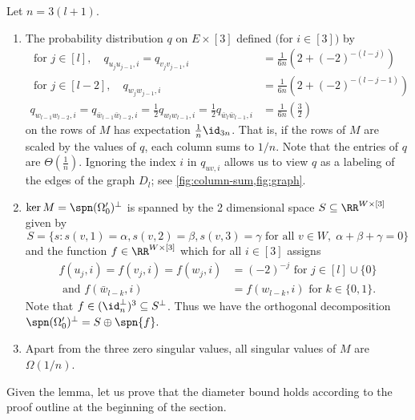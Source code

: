  
 \begin{lem}\label{lem:diameter}Let $n = 3(l + 1)$. 
\begin{enumerate}
\item\label{it:stoch}The probability distribution $q$ on $E\times [3]$ defined $($for $i\in [3])$ by 
\begin{align*}\text{ for }j \in [l], \quad q_{u_j u_{j-1}, i} = q_{v_j v_{j -1}, i} &= \frac{1}{6n} \left(2 + (-2)^{- (l - j)}\right) \\
 \text{ for } j \in [l-2], \quad q_{w_j w_{j -1}, i}  &= \frac{1}{6n} \left(2 + (-2)^{- (l - j - 1)}\right) \\
q_{w_{l-1} w_{l -2}, i} = q_{\bar{w}_{l-1} \bar{w}_{l -2}, i} = \frac{1}{2} q_{w_{l} w_{l -1}, i} = \frac{1}{2} q_{\bar{w}_{l} \bar{w}_{l -1}, i} &= \frac{1}{6n} \left(\frac{3}{2}\right)
\end{align*}
on the rows of $M$ has expectation $\frac{1}{n}\id_{3n}$. That is, if the rows of $M$ are scaled by the values of $q$, each column sums to $1/n$. Note that the entries of $q$ are $\Theta(\frac{1}{n})$. Ignoring the index $i$ in $q_{uv,i}$ allows us to view $q$ as a labeling of the edges of the graph $D_l$; see \cref{fig:column-sum,fig:graph}. 
\item\label{it:kernel} $\ker M = \spn (\Omega_0')^\perp$ is spanned by the 2 dimensional space $S \subseteq \RR^{W \times [3]}$ given by
$$ S = \{s: s(v, 1) = \alpha, s(v, 2) = \beta, s(v, 3) = \gamma \text{ for all } v \in W,\; \alpha + \beta + \gamma = 0 \}$$
 and the function $f \in \RR^{W \times [3]}$ which for all $i \in [3]$ assigns
 \begin{align}f (u_j, i) = f(v_j, i) = f(w_j, i) &= (-2)^{-j} \text{ for } j \in [l] \cup \{0\}\nonumber \\
 \textrm{ and } f(\bar{w}_{l-k}, i)  &=  f(w_{l-k}, i) \text{ for } k \in \{0,1\}.\label{eq:kernel} 
 \end{align}
 Note that $f \in (\id_n^\perp)^3 \subseteq S^\perp$. Thus we have the orthogonal decomposition $\spn(\Omega_0')^\perp = S \oplus \spn{f}.$
\item\label{it:singular} Apart from the three zero singular values, all singular values of $M$ are $\Omega(1/n)$.

\end{enumerate}

\end{lem}


Given the lemma, let us prove that the diameter bound holds according to the proof outline at the beginning of the section.

